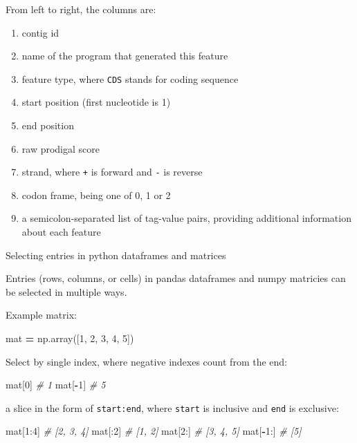 \documentclass[
]{book}
\newenvironment{Shaded}{\begin{snugshade}}{\end{snugshade}}
\newcommand{\CommentTok}[1]{\textcolor[rgb]{0.56,0.35,0.01}{\textit{#1}}}
\newcommand{\DecValTok}[1]{\textcolor[rgb]{0.00,0.00,0.81}{#1}}
\newcommand{\NormalTok}[1]{#1}
\newcommand{\OperatorTok}[1]{\textcolor[rgb]{0.81,0.36,0.00}{\textbf{#1}}}
\providecommand{\tightlist}{%
  \setlength{\itemsep}{0pt}\setlength{\parskip}{0pt}}
\begin{document}
From left to right, the columns are:

\begin{enumerate}
\def\labelenumi{\arabic{enumi}.}
\setcounter{enumi}{-1}
\tightlist
\item
  contig id
\item
  name of the program that generated this feature
\item
  feature type, where \texttt{CDS} stands for coding sequence
\item
  start position (first nucleotide is 1)
\item
  end position
\item
  raw prodigal score
\item
  strand, where \texttt{+} is forward and \texttt{-} is reverse
\item
  codon frame, being one of 0, 1 or 2
\item
  a semicolon-separated list of tag-value pairs, providing additional information about each feature
\end{enumerate}

Selecting entries in python dataframes and matrices

Entries (rows, columns, or cells) in pandas dataframes and numpy matricies can be selected in multiple ways.

Example matrix:

\begin{Shaded}
\begin{Highlighting}[numbers=left,,]
\NormalTok{mat }\OperatorTok{=}\NormalTok{ np.array([}\DecValTok{1}\NormalTok{, }\DecValTok{2}\NormalTok{, }\DecValTok{3}\NormalTok{, }\DecValTok{4}\NormalTok{, }\DecValTok{5}\NormalTok{])}
\end{Highlighting}
\end{Shaded}

Select by single index, where negative indexes count from the end:

\begin{Shaded}
\begin{Highlighting}[numbers=left,,]
\NormalTok{mat[}\DecValTok{0}\NormalTok{]      }\CommentTok{\# 1}
\NormalTok{mat[}\OperatorTok{{-}}\DecValTok{1}\NormalTok{]     }\CommentTok{\# 5}
\end{Highlighting}
\end{Shaded}

a slice in the form of \texttt{start:end}, where \texttt{start} is inclusive and \texttt{end} is exclusive:

\begin{Shaded}
\begin{Highlighting}[numbers=left,,]
\NormalTok{mat[}\DecValTok{1}\NormalTok{:}\DecValTok{4}\NormalTok{]    }\CommentTok{\# [2, 3, 4]}
\NormalTok{mat[:}\DecValTok{2}\NormalTok{]     }\CommentTok{\# [1, 2]}
\NormalTok{mat[}\DecValTok{2}\NormalTok{:]     }\CommentTok{\# [3, 4, 5]}
\NormalTok{mat[}\OperatorTok{{-}}\DecValTok{1}\NormalTok{:]    }\CommentTok{\# [5]}
\end{Highlighting}
\end{Shaded}
\end{document}
